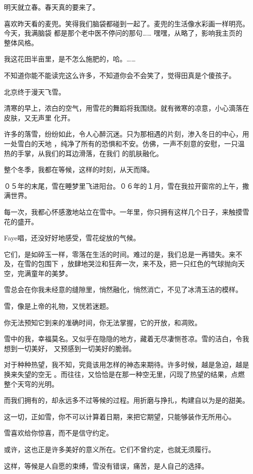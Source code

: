 \documentclass[12pt,a4paper]{article}
\begin{document}
		明天就立春。春天真的要来了。


		喜欢昨天看的麦兜。笑得我们脑袋都碰到一起了。麦兜的生活像水彩画一样明亮。今天，我满脑袋
	都是那个老中医不停问的那句…… 嘿嘿，从略了，影响我主页的整体风格。

		我这花田半亩里，是不怎么施肥的，哈。……

		不知道你能不能读完这么许多，不知道你会不会笑了，觉得田真是个傻孩子。

	\endwriting



		北京终于漫天飞雪。

		清寒的早上，浓白的空气，用雪花的舞蹈将我围绕。就有微寒的凉意，小心滴落在皮肤，又无声里
	化开。

		许多的落雪，纷纷如此，令人心醉沉迷。只为那相遇的片刻，渗入冬日的中心，用一处雪白的天地
	，纯净了所有的恐惧和不安。仿佛，一声不刻意的安慰，一只温热的手掌，从我们的耳边滑落，在我们
	的肌肤融化。

		整个冬季，我都在等候，这样的时刻，从天而降。

		０５年的末尾，雪在睡梦里飞进阳台。０６年的１月，雪在我拉开窗帘的上午，撒满世界。

		每一次，我都心怀感激地站立在雪中。一年里，你只拥有这样几个日子，来触摸雪花的盛开。

		Faye唱，还没好好地感受，雪花绽放的气候。

		它们，是如碎玉一样，零落在生活的时间。难过的是，我们总是一再错失。来不及，在雪的包围下
	，放肆地哭泣和狂奔一次，来不及，把一只红色的气球抛向天空，完满童年的美梦。

		雪总会在你我未经意的缝隙里，悄然融化，悄然消亡，不见了冰清玉洁的模样。

		雪，像是上帝的礼物，又恍若迷题。

		你无法预知它到来的准确时间，你无法掌握，它的开放，和凋败。

		雪中的我，幸福莫名。又似乎在隐隐的地方，藏着无尽凄恻苍凉。雪的洁白，令我想到一切美好，
	又预感到一切美好的脆弱。

		对于种种热望，我不知，究竟该用怎样的神态来期待。许多时候，越是急迫，越是换来失望的空无
	。而往往，又恰恰是在那一种空无里，闪现了热望的结果，点燃整个天穹的光明。

		而我们拥有的，却永远多不过等候的过程。用折磨与挣扎，构建自以为是的甜美。

		这一切，正如雪，你不可以计算着日期，来把它期望，只能够装作无所用心。\par
		雪喜欢给你惊喜，而不是信守约定。\par
		或许，这也正是许多美好的意义所在。它们不曾约定，也就无须履行。\par
		这样，等候是人自愿的束缚，雪没有错误，痛苦，是人自己的选择。
\end{document}
